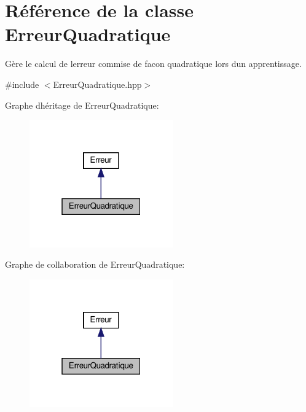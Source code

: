\hypertarget{class_erreur_quadratique}{}\section{Référence de la classe Erreur\+Quadratique}
\label{class_erreur_quadratique}


Gère le calcul de l\textquotesingle{}erreur commise de facon quadratique lors d\textquotesingle{}un apprentissage.  




{\ttfamily \#include $<$Erreur\+Quadratique.\+hpp$>$}



Graphe d\textquotesingle{}héritage de Erreur\+Quadratique\+:\nopagebreak
\begin{figure}[H]
\begin{center}
\leavevmode
\includegraphics[width=175pt]{class_erreur_quadratique__inherit__graph}
\end{center}
\end{figure}


Graphe de collaboration de Erreur\+Quadratique\+:\nopagebreak
\begin{figure}[H]
\begin{center}
\leavevmode
\includegraphics[width=175pt]{class_erreur_quadratique__coll__graph}
\end{center}
\end{figure}
